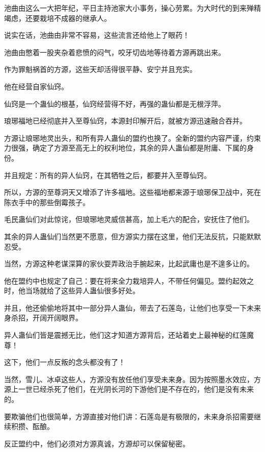 
\begin{this_body}

池曲由这么一大把年纪，平日主持池家大小事务，操心劳累。为大时代的到来殚精竭虑，还要栽培不成器的继承人。

说实在话，池曲由非常不容易，这些流言还给他上了眼药！

池曲由憋着一股夹杂着悲愤的闷气，咬牙切齿地等待着方源再跳出来。

作为罪魁祸首的方源，这些天却活得很平静、安宁并且充实。

他在经营自家仙窍。

仙窍是一个蛊仙的根基，仙窍经营得不好，再强的蛊仙都是无根浮萍。

琅琊福地已经彻底并入至尊仙窍，本源封印解开后，就被方源迅速融合吞并。

方源让琅琊地灵出头，和所有异人蛊仙的盟约也换了。全新的盟约内容严谨，约束力很强，确定了方源至高无上的权利地位，其余的异人蛊仙都是附庸、下属的身份。

并且规定：所有的异人仙窍，在其牺牲之后，都要并入至尊仙窍。

所以，方源的至尊洞天又增添了许多福地。这些福地都来源于琅琊保卫战中，死在陈衣手中的那些倒霉孩子。

毛民蛊仙们对此惊诧，但琅琊地灵威信甚高，加上毛六的配合，安抚住了他们。

其余的异人蛊仙们当然更不愿意，但方源实力摆在这里，他们无法反抗，只能默默忍受。

当然，方源这种老谋深算的家伙耍弄政治手腕起来，比起武庸也是不遑多让的。

他在盟约中也规定了自己：要在将来全力栽培异人，不带任何偏见。盟约起效之时，他当场就给了这些异人蛊仙很多好处。

并且，他还偷偷地将其中一部分异人蛊仙，带去了石莲岛，让他们也享受一下未来身杀招，开阔开阔眼界。

异人蛊仙们皆是震撼无比，他们这才知道方源背后，还站着史上最神秘的红莲魔尊！

这下，他们一点反叛的念头都没有了！

当然，雪儿、冰卓这些人，方源没有放任他们享受未来身。因为按照墨水效应，方源上一世已经杀死了他们，在光阴长河的下游他们是不存在的，他们是没有未来的。

要欺骗他们也很简单，方源直接对他们讲：石莲岛是有极限的，未来身杀招需要继续积攒、酝酿。

反正盟约中，他们必须对方源真诚，方源却可以保留秘密。


\end{this_body}
